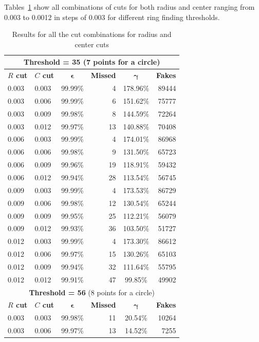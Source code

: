 \documentclass[11pt,twoside]{scrreprt}
\begin{document}
Tables~\ref{tab:longtable} show all combinations of cuts for both radius and center ranging from 0.003 to
0.0012 in steps of $0.003$ for different ring finding thresholds. 
\newpage
\begin{longtable}{llcrcr}
\caption{Results for all the cut combinations for radius and center cuts}\label{tab:longtable}\\
\toprule
\multicolumn{6}{c}{\textbf{Threshold = 35} (7 points for a circle)}\\
\midrule
\textbf{$R$ cut} & \textbf{$C$ cut} & $\boldsymbol{\epsilon}$ & \textbf{Missed} & $\boldsymbol{\gamma}$ & \textbf{Fakes} \\
\midrule
0.003 & 0.003 & 99.99\% & 4 & 178.96\% & 89444 \\
0.003 & 0.006 & 99.99\% & 6 & 151.62\% & 75777 \\
0.003 & 0.009 & 99.98\% & 8 & 144.59\% & 72264 \\
0.003 & 0.012 & 99.97\% & 13 & 140.88\% & 70408 \\
0.006 & 0.003 & 99.99\% & 4 & 174.01\% & 86968 \\
0.006 & 0.006 & 99.98\% & 9 & 131.50\% & 65723 \\
0.006 & 0.009 & 99.96\% & 19 & 118.91\% & 59432 \\
0.006 & 0.012 & 99.94\% & 28 & 113.54\% & 56745 \\
0.009 & 0.003 & 99.99\% & 4 & 173.53\% & 86729 \\
0.009 & 0.006 & 99.98\% & 12 & 130.54\% & 65244 \\
0.009 & 0.009 & 99.95\% & 25 & 112.21\% & 56079 \\
0.009 & 0.012 & 99.93\% & 36 & 103.50\% & 51727 \\
0.012 & 0.003 & 99.99\% & 4 & 173.30\% & 86612 \\
0.012 & 0.006 & 99.97\% & 15 & 130.26\% & 65103 \\
0.012 & 0.009 & 99.94\% & 32 & 111.64\% & 55795 \\
0.012 & 0.012 & 99.91\% & 47 & 99.85\% & 49902 \\
\bottomrule
\toprule
\multicolumn{6}{c}{\textbf{Threshold = 56} (8 points for a circle)}\\
\midrule
\textbf{$R$ cut} & \textbf{$C$ cut} & $\boldsymbol{\epsilon}$ & \textbf{Missed} & $\boldsymbol{\gamma}$ & \textbf{Fakes} \\
\midrule
0.003 & 0.003 & 99.98\% & 11 & 20.54\% & 10264 \\
0.003 & 0.006 & 99.97\% & 13 & 14.52\% & 7255 \\

\end{longtable}
\end{document}
